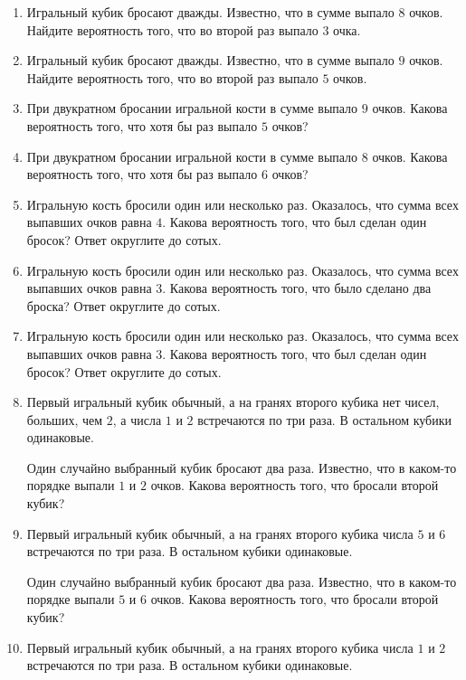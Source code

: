 \documentclass[12pt, a4paper]{article}
\begin{document}
\begin{enumerate}
		\item Игральный кубик бросают дважды. Известно, что в сумме выпало \( 8 \) очков. Найдите вероятность того, что во второй раз выпало \( 3 \) очка.
		\item Игральный кубик бросают дважды. Известно, что в сумме выпало \( 9 \) очков. Найдите вероятность того, что во второй раз выпало \( 5 \) очков.
		\item При двукратном бросании игральной кости в сумме выпало \( 9 \) очков. Какова вероятность того, что хотя бы раз выпало \( 5 \) очков?
		\item При двукратном бросании игральной кости в сумме выпало \( 8 \) очков. Какова вероятность того, что хотя бы раз выпало \( 6 \) очков?
		\item Игральную кость бросили один или несколько раз. Оказалось, что сумма всех выпавших очков равна \( 4 \). Какова вероятность того, что был сделан один бросок? Ответ округлите до сотых.
		\item Игральную кость бросили один или несколько раз. Оказалось, что сумма всех выпавших очков равна \( 3 \). Какова вероятность того, что было сделано два броска? Ответ округлите до сотых.
		\item Игральную кость бросили один или несколько раз. Оказалось, что сумма всех выпавших очков равна \( 3 \). Какова вероятность того, что был сделан один бросок? Ответ округлите до сотых.
		\item Первый игральный кубик обычный, а на гранях второго кубика нет чисел, больших, чем \( 2 \), а числа \( 1 \) и \( 2 \) встречаются по три раза. В остальном кубики одинаковые.
		
		Один случайно выбранный кубик бросают два раза. Известно, что в каком-то порядке выпали \( 1 \) и \( 2 \) очков. Какова вероятность того, что бросали второй кубик?
		\item Первый игральный кубик обычный, а на гранях второго кубика числа \( 5 \) и \( 6 \) встречаются по три раза. В остальном кубики одинаковые.
		
		Один случайно выбранный кубик бросают два раза. Известно, что в каком-то порядке выпали \( 5  \) и \( 6 \) очков. Какова вероятность того, что бросали второй кубик?
		\item Первый игральный кубик обычный, а на гранях второго кубика числа \( 1 \) и \( 2 \) встречаются по три раза. В остальном кубики одинаковые.
		

\end{enumerate}
\end{document}
